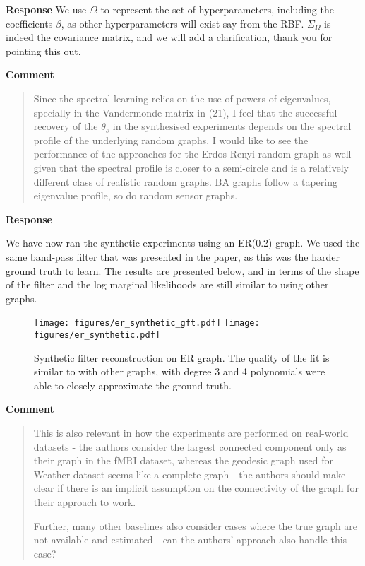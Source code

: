 \documentclass[11pt,onecolumn,journal]{IEEEtran}
\theoremstyle{definition}
\begin{document}
\textbf{Response}
We use $\Omega$ to represent the set of hyperparameters, including the coefficients $\beta$, as other hyperparameters will exist say from the RBF. $\Sigma_\Omega$ is indeed the covariance matrix, and we will add a clarification, thank you for pointing this out.

\textbf{Comment}
\begin{quote}
Since the spectral learning relies on the use of powers of eigenvalues, specially in the Vandermonde matrix in (21), I feel that the successful recovery of the $\theta_s$ in the synthesised experiments depends on the spectral profile of the underlying random graphs. I would like to see the performance of the approaches for the Erdos Renyi random graph as well - given that the spectral profile is closer to a semi-circle and is a relatively different class of realistic random graphs. BA graphs follow a tapering eigenvalue profile, so do random sensor graphs.
\end{quote}

\textbf{Response}

We have now ran the synthetic experiments using an ER(0.2) graph. We used the same band-pass filter that was presented in the paper, as this was the harder ground truth to learn. The results are presented below, and in terms of the shape of the filter and the log marginal likelihoods are still similar to using other graphs.

\begin{figure}[h]
\centering
\texttt{[image: figures/er\_synthetic\_gft.pdf]}
\texttt{[image: figures/er\_synthetic.pdf]}
\caption{Synthetic filter reconstruction on ER graph. The quality of the fit is similar to with other graphs, with degree 3 and 4 polynomials were able to closely approximate the ground truth.}
\end{figure}

\textbf{Comment}

\begin{quote}
This is also relevant in how the experiments are performed on real-world datasets - the authors consider the largest connected component only as their graph in the fMRI dataset, whereas the geodesic graph used for Weather dataset seems like a complete graph - the authors should make clear if there is an implicit assumption on the connectivity of the graph for their approach to work.

Further, many other baselines also consider cases where the true graph are not available and estimated - can the authors’ approach also handle this case?
\end{quote}
\end{document}
